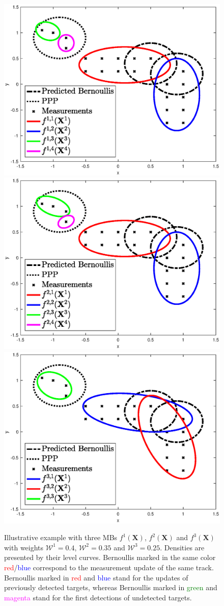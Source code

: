 \documentclass[journal]{IEEEtran}
\begin{document}
\begin{figure}[!t]
    \centering
    \includegraphics[width = 0.6\columnwidth]{example1.eps}
    \includegraphics[width = 0.6\columnwidth]{example2.eps}
    \includegraphics[width = 0.6\columnwidth]{example3.eps}
    \caption{Illustrative example with three MBs $f^1(\mathbf{X})$, $f^2(\mathbf{X})$ and $f^3(\mathbf{X})$ with weights $\mathcal{W}^1=0.4$, $\mathcal{W}^2=0.35$ and $\mathcal{W}^3=0.25$. Densities are presented by their level curves. Bernoullis marked in the same color \textcolor{red}{red}/\textcolor{blue}{blue} correspond to the measurement update of the same track. Bernoullis marked in \textcolor{red}{red} and \textcolor{blue}{blue} stand for the updates of previously detected targets, whereas Bernoullis marked in \textcolor{green}{green} and \textcolor{magenta}{magenta} stand for the first detections of undetected targets.}

\end{figure}
\end{document}
